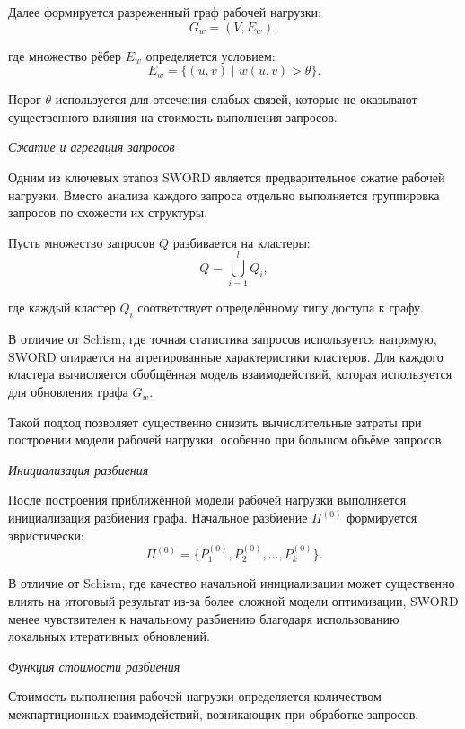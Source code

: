 Далее формируется разреженный граф рабочей нагрузки:
\begin{equation*}
G_w = (V, E_w),
\end{equation*}

где множество рёбер $E_w$ определяется условием:
\begin{equation*}
E_w = \{(u, v) \mid w(u, v) > \theta\}.
\end{equation*}

Порог $\theta$ используется для отсечения слабых связей, которые не оказывают существенного влияния на стоимость выполнения запросов.

\textit{Сжатие и агрегация запросов}

Одним из ключевых этапов SWORD является предварительное сжатие рабочей нагрузки. Вместо анализа каждого запроса отдельно выполняется группировка запросов по схожести их структуры.

Пусть множество запросов $Q$ разбивается на кластеры:
\begin{equation*}
Q = \bigcup_{i=1}^{l} Q_i,
\end{equation*}

где каждый кластер $Q_i$ соответствует определённому типу доступа к графу.

В отличие от Schism, где точная статистика запросов используется напрямую, SWORD опирается на агрегированные характеристики кластеров. Для каждого кластера вычисляется обобщённая модель взаимодействий, которая используется для обновления графа $G_w$.

Такой подход позволяет существенно снизить вычислительные затраты при построении модели рабочей нагрузки, особенно при большом объёме запросов.

\textit{Инициализация разбиения}

После построения приближённой модели рабочей нагрузки выполняется инициализация разбиения графа. Начальное разбиение $\Pi^{(0)}$ формируется эвристически:
\begin{equation*}
\Pi^{(0)} = \{P_1^{(0)}, P_2^{(0)}, \dots, P_k^{(0)}\}.
\end{equation*}

В отличие от Schism, где качество начальной инициализации может существенно влиять на итоговый результат из-за более сложной модели оптимизации, SWORD менее чувствителен к начальному разбиению благодаря использованию локальных итеративных обновлений.

\textit{Функция стоимости разбиения}

Стоимость выполнения рабочей нагрузки определяется количеством межпартиционных взаимодействий, возникающих при обработке запросов.

